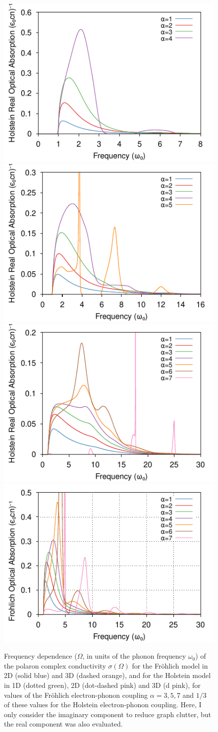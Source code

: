 \begin{figure}[!tbp]
    \centering
    \includegraphics[width=.49\textwidth]{figures/holstein-1d-real-conductivity-freq-COLOUR.pdf}
    \includegraphics[width=.49\textwidth]{figures/holstein-2d-real-conductivity-freq-COLOUR.pdf}
    \includegraphics[width=.49\textwidth]{figures/holstein-3d-real-conductivity-freq-COLOUR.pdf}
    \includegraphics[width=.49\textwidth]{chapters/literature/figures/frohlich-3d-real-conductivity-freq-COLOUR.pdf}
    \caption{Frequency dependence ($\Omega$, in units of the phonon frequency $\omega_0$) of the polaron complex conductivity $\sigma(\Omega)$ for the Fr\"ohlich model in 2D (solid blue) and 3D (dashed orange), and for the Holstein model in 1D (dotted green), 2D (dot-dashed pink) and 3D (d pink), for values of the Fr\"ohlich electron-phonon coupling $\alpha = 3, 5, 7$ and $1/3$ of these values for the Holstein electron-phonon coupling. Here, I only consider the imaginary component to reduce graph clutter, but the real component was also evaluated.}
    \label{fig:re_con_freq}
\end{figure}
